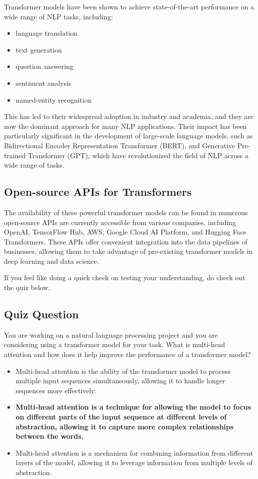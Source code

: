 Transformer models have been shown to achieve state-of-the-art performance on a wide range of NLP tasks, including:

\begin{itemize}
    \item language translation
    \item text generation
    \item question answering
    \item sentiment analysis
    \item named-entity recognition
\end{itemize}
This has led to their widespread adoption in industry and academia, and they are now the dominant approach for many NLP applications. Their impact has been particularly significant in the development of large-scale language models, such as Bidirectional Encoder Representation Transformer (BERT), and Generative Pre-trained Transformer (GPT), which have revolutionized the field of NLP across a wide range of tasks.

\subsection{Open-source APIs for Transformers}

The availability of these powerful transformer models can be found in numerous open-source APIs are currently accessible from various companies, including OpenAI, TensorFlow Hub, AWS, Google Cloud AI Platform, and Hugging Face Transformers. These APIs offer convenient integration into the data pipelines of businesses, allowing them to take advantage of pre-existing transformer models in deep learning and data science. \newline

If you feel like doing a quick check on testing your understanding, do check out the quiz below.

\subsection{Quiz Question}

You are working on a natural language processing project and you are considering using a transformer model for your task. What is multi-head attention and how does it help improve the performance of a transformer model?

\begin{itemize}
    \item Multi-head attention is the ability of the transformer model to process multiple input sequences simultaneously, allowing it to handle longer sequences more effectively.
    \item \textbf{Multi-head attention is a technique for allowing the model to focus on different parts of the input sequence at different levels of abstraction, allowing it to capture more complex relationships between the words.}
    \item Multi-head attention is a mechanism for combining information from different layers of the model, allowing it to leverage information from multiple levels of abstraction.
\end{itemize}

